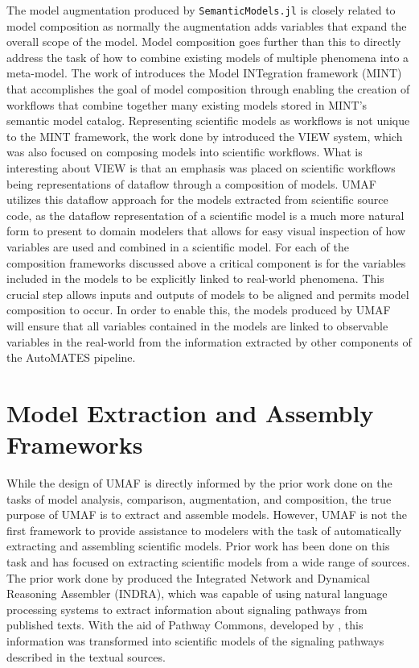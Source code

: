 The model augmentation produced by \texttt{SemanticModels.jl} is closely related to model composition as normally the augmentation adds variables that expand the overall scope of the model.
Model composition goes further than this to directly address the task of how to combine existing models of multiple phenomena into a meta-model.
The work of \citet{gil2018mint} introduces the Model INTegration framework (MINT) that accomplishes the goal of model composition through enabling the creation of workflows that combine together many existing models stored in MINT's semantic model catalog.
Representing scientific models as workflows is not unique to the MINT framework, the work done by \citet{fei2010dataflow} introduced the VIEW system, which was also focused on composing models into scientific workflows.
What is interesting about VIEW is that an emphasis was placed on scientific workflows being representations of dataflow through a composition of models.
UMAF utilizes this dataflow approach for the models extracted from scientific source code, as the dataflow representation of a scientific model is a much more natural form to present to domain modelers that allows for easy visual inspection of how variables are used and combined in a scientific model.
For each of the composition frameworks discussed above a critical component is for the variables included in the models to be explicitly linked to real-world phenomena.
This crucial step allows inputs and outputs of models to be aligned and permits model composition to occur.
In order to enable this, the models produced by UMAF will ensure that all variables contained in the models are linked to observable variables in the real-world from the information extracted by other components of the AutoMATES pipeline.

\section{Model Extraction and Assembly Frameworks \label{sec:rwork_extract_assemble}}
While the design of UMAF is directly informed by the prior work done on the tasks of model analysis, comparison, augmentation, and composition, the true purpose of UMAF is to extract and assemble models.
However, UMAF is not the first framework to provide assistance to modelers with the task of automatically extracting and assembling scientific models.
Prior work has been done on this task and has focused on extracting scientific models from a wide range of sources.
The prior work done by \citet{gyori2017word} produced the Integrated Network and Dynamical Reasoning Assembler (INDRA), which was capable of using natural language processing systems to extract information about signaling pathways from published texts.
With the aid of Pathway Commons, developed by \citet{cerami2010pathway}, this information was transformed into scientific models of the signaling pathways described in the textual sources.


